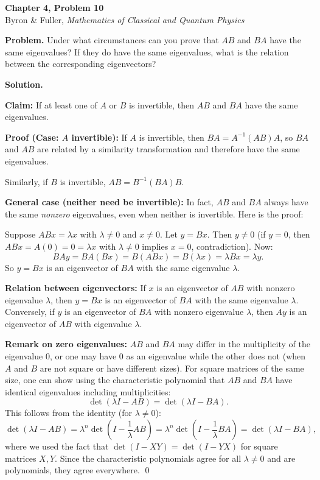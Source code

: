 \documentclass[12pt]{article}
\begin{document}
\begin{center}
{\Large\bfseries Chapter 4, Problem 10}\\[6pt]
Byron \& Fuller, \textit{Mathematics of Classical and Quantum Physics}
\end{center}

\bigskip

\textbf{Problem.} Under what circumstances can you prove that $AB$ and $BA$ have the same eigenvalues? If they do have the same eigenvalues, what is the relation between the corresponding eigenvectors?

\bigskip
\textbf{Solution.}

\textbf{Claim:} If at least one of $A$ or $B$ is invertible, then $AB$ and $BA$ have the same eigenvalues.

\textbf{Proof (Case: $A$ invertible):}
If $A$ is invertible, then $BA = A^{-1}(AB)A$, so $BA$ and $AB$ are related by a similarity transformation and therefore have the same eigenvalues.

Similarly, if $B$ is invertible, $AB = B^{-1}(BA)B$.

\textbf{General case (neither need be invertible):}
In fact, $AB$ and $BA$ always have the same \emph{nonzero} eigenvalues, even when neither is invertible. Here is the proof:

Suppose $ABx = \lambda x$ with $\lambda \neq 0$ and $x \neq 0$. Let $y = Bx$. Then $y \neq 0$ (if $y = 0$, then $ABx = A(0) = 0 = \lambda x$ with $\lambda \neq 0$ implies $x = 0$, contradiction). Now:
\[
BA y = BA(Bx) = B(ABx) = B(\lambda x) = \lambda Bx = \lambda y.
\]
So $y = Bx$ is an eigenvector of $BA$ with the same eigenvalue $\lambda$.

\textbf{Relation between eigenvectors:} If $x$ is an eigenvector of $AB$ with nonzero eigenvalue $\lambda$, then $y = Bx$ is an eigenvector of $BA$ with the same eigenvalue $\lambda$. Conversely, if $y$ is an eigenvector of $BA$ with nonzero eigenvalue $\lambda$, then $Ay$ is an eigenvector of $AB$ with eigenvalue $\lambda$.

\textbf{Remark on zero eigenvalues:} $AB$ and $BA$ may differ in the multiplicity of the eigenvalue 0, or one may have 0 as an eigenvalue while the other does not (when $A$ and $B$ are not square or have different sizes). For square matrices of the same size, one can show using the characteristic polynomial that $AB$ and $BA$ have identical eigenvalues including multiplicities:
\[
\det(\lambda I - AB) = \det(\lambda I - BA).
\]
This follows from the identity (for $\lambda \neq 0$):
\[
\det(\lambda I - AB) = \lambda^n \det\!\left(I - \frac{1}{\lambda}AB\right) = \lambda^n \det\!\left(I - \frac{1}{\lambda}BA\right) = \det(\lambda I - BA),
\]
where we used the fact that $\det(I - XY) = \det(I - YX)$ for square matrices $X, Y$. Since the characteristic polynomials agree for all $\lambda \neq 0$ and are polynomials, they agree everywhere. \qed
\end{document}
